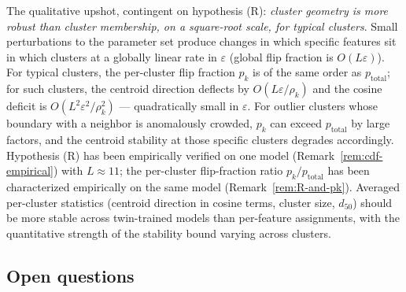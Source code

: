 \documentclass[11pt,letterpaper]{article}
\theoremstyle{definition}
\begin{document}
The qualitative upshot, contingent on hypothesis (R): \emph{cluster geometry is more robust than cluster membership, on a square-root scale, for typical clusters}. Small perturbations to the parameter set produce changes in which specific features sit in which clusters at a globally linear rate in $\varepsilon$ (global flip fraction is $O(L \varepsilon)$). For typical clusters, the per-cluster flip fraction $p_k$ is of the same order as $p_{\mathrm{total}}$; for such clusters, the centroid direction deflects by $O(L \varepsilon / \rho_k)$ and the cosine deficit is $O(L^2 \varepsilon^2 / \rho_k^2)$ --- quadratically small in $\varepsilon$. For outlier clusters whose boundary with a neighbor is anomalously crowded, $p_k$ can exceed $p_{\mathrm{total}}$ by large factors, and the centroid stability at those specific clusters degrades accordingly. Hypothesis (R) has been empirically verified on one model (Remark~\ref{rem:cdf-empirical}) with $L \approx 11$; the per-cluster flip-fraction ratio $p_k / p_{\mathrm{total}}$ has been characterized empirically on the same model (Remark~\ref{rem:R-and-pk}). Averaged per-cluster statistics (centroid direction in cosine terms, cluster size, $d_{50}$) should be more stable across twin-trained models than per-feature assignments, with the quantitative strength of the stability bound varying across clusters.

\subsection*{Open questions}
\end{document}
